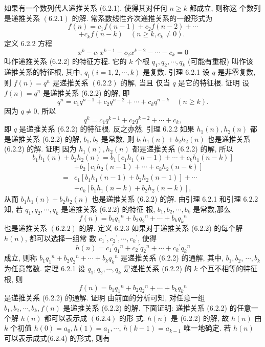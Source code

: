 \documentclass{report}
\begin{document}
	如果有一个数列代人递推关系 (6.2.1), 使得其对任何 $n \geqslant k$ 都成立, 则称这 个数列是递推关系 $(6.2 .1)$ 的解.
	常系数线性齐次递推关系的一般形式为
	$$
	f(n)=c_1 f(n-1)+c_2 f(n-2)+\cdots
	$$
	$$
	+c_k f(n-k) \quad\left(n \geqslant k, c_k \neq 0\right) \text {. }
	$$
	定义 6.2.2 方程
	$$
	x^k-c_1 x^{k-1}-c_2 x^{k-2}-\cdots-c_k=0
	$$
	叫作递推关系 (6.2.2) 的特征方程. 它的 $k$ 个根 $q_1, q_2, \cdots, q_k$ (可能有重根) 叫作该 递推关系的特征根, 其中, $q_i(i=1,2, \cdots, k)$ 是复数.
	引理 6.2.1 设 $q$ 是非零复数, 则 $f(n)=q^n$ 是递推关系 $(6.2 .2)$ 的解, 当且 仅当 $q$ 是它的特征根.
	证明 设 $f(n)=q^n$ 是递推关系 (6.2.2) 的解, 即
	$$
	q^n=c_1 q^{n-1}+c_2 q^{n-2}+\cdots+c_k q^{n-k} \quad(n \geqslant k) .
	$$
	因为 $q \neq 0$, 所以
	$$
	q^k=c_1 q^{k-1}+c_2 q^{k-2}+\cdots+c_k,
	$$
	即 $q$ 是递推关系 (6.2.2) 的特征根. 反之亦然.
	引理 6.2.2 如果 $h_1(n), h_2(n)$ 都是递推关系 (6.2.2) 的解, $b_1, b_2$ 是常数, 则 $b_1 h_1(n)+b_2 h_2(n)$ 也是递推关系 (6.2.2) 的解.
	证明 因为 $h_1(n), h_2(n)$ 都是递推关系 (6.2.2) 的解, 所以
	$$
	b_1 h_1(n)+b_2 h_2(n)=b_1\left[c_1 h_1(n-1)+\cdots+c_k h_1(n-k)\right]
	$$
	$$
	\begin{aligned}
	&+b_2\left[c_1 h_2(n-1)+\cdots+c_k h_2(n-k)\right] \\
	=& c_1\left[b_1 h_1(n-1)+b_2 h_2(n-1)\right]+\cdots \\
	&+c_k\left[b_1 h_1(n-k)+b_2 h_2(n-k)\right],
	\end{aligned}
	$$
	从而 $b_1 h_1(n)+b_2 h_2(n)$ 也是递推关系 (6.2.2) 的解.
	由引理 6.2.1 和引理 $6.2 .2$ 知, 若 $q_1, q_2, \cdots, q_k$ 是递推关系 (6.2.2) 的特征 根, $b_1, b_2, \cdots, b_k$ 是常数,那么
	$$
	f(n)=b_1 q_1{ }^n+b_2 q_2{ }^n+\cdots+b_k q_k{ }^n
	$$
	也是递推关系 $(6.2 .2)$ 的解.
	定义 6.2.3 如果对于递推关系 (6.2.2) 的每个解 $h(n)$, 都可以选择一组常 数 $c_1{ }^{\prime}, c_2{ }^{\prime}, \cdots, c_k{ }^{\prime}$, 使得
	$$
	h(n)=c_1{ }^{\prime} q_1{ }^n+c_2{ }^{\prime} q_2{ }^n+\cdots+c_k{ }^{\prime} q_k{ }^n
	$$
	成立, 则称 $b_1 q_1{ }^n+b_2 q_2{ }^n+\cdots+b_k q_k{ }^n$ 是递推关系 (6.2.2) 的通解, 其中, $b_1, b_2$, $\cdots, b_k$ 为任意常数.
	定理 6.2.1 设 $q_1, q_2, \cdots, q_k$ 是递推关系 (6.2.2) 的 $k$ 个互不相等的特征根, 则
	$$
	f(n)=b_1 q_1{ }^n+b_2 q_2{ }^n+\cdots+b_k q_k{ }^n
	$$
	是递推关系 (6.2.2) 的通解.
	证明 由前面的分析可知, 对任意一组 $b_1, b_2, \cdots, b_k, f(n)$ 是递推关系 (6.2.2) 的解.
	下面证明: 递推关系 (6.2.2) 的任意一个解 $h(n)$ 都可以表示成 $(6.2 .4)$ 的形 式. $h(n)$ 是 (6.2.2) 的解, 故 $h(n)$ 由 $k$ 个初值 $h(0)=a_0, h(1)=a_1, \cdots$, $h(k-1)=a_{k-1}$ 唯一地确定. 若 $h(n)$ 可以表示成式(6.2.4) 的形式, 则有
\end{document}
